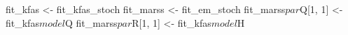 \begin{Schunk}
\begin{Sinput}
 fit_kfas <- fit_kfas_stoch
 fit_marss <- fit_em_stoch
 fit_marss$par$Q[1, 1] <- fit_kfas$model$Q
 fit_marss$par$R[1, 1] <- fit_kfas$model$H
\end{Sinput}
\end{Schunk}
